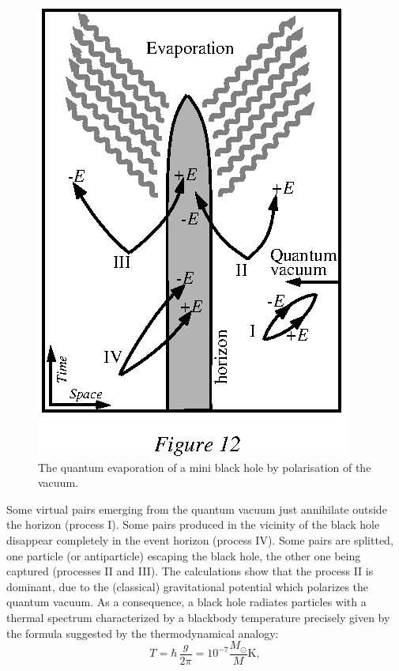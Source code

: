 \documentclass{lamuphys}
\begin{document}
\begin{figure}[tb]
  \begin{center}
    \leavevmode
    \includegraphics{quantum.ps}
    \caption{The quantum evaporation of a mini black hole by
      polarisation of the vacuum.}
  \end{center}
\end{figure}
Some virtual pairs  emerging from the quantum vacuum
just annihilate outside the horizon (process I). Some pairs produced in the
vicinity of the black hole disappear completely in the event horizon (process
IV). Some pairs are splitted, one particle (or antiparticle) escaping the black
hole, the other one being captured (processes II and III). The calculations show
that the process II is dominant, due to the (classical) gravitational 
potential which polarizes the quantum vacuum. As a consequence,
a black hole radiates particles
with a thermal spectrum characterized by a blackbody temperature precisely
given by the formula suggested by the thermodynamical analogy:
 \begin{equation}
  T = \hbar \,\frac{g}{2\pi} = 10^{-7} \frac{M_{\odot}}{M} \textrm{K},   
        \label{luminet:11}
 \end{equation} 
\end{document}
